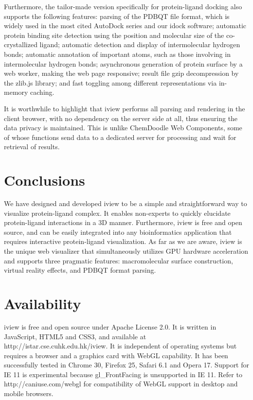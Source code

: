 Furthermore, the tailor-made version specifically for protein-ligand docking also supports the following features: parsing of the PDBQT file format, which is widely used in the most cited AutoDock series and our idock software; automatic protein binding site detection using the position and molecular size of the co-crystallized ligand; automatic detection and display of intermolecular hydrogen bonds; automatic annotation of important atoms, such as those involving in intermolecular hydrogen bonds; asynchronous generation of protein surface by a web worker, making the web page responsive; result file gzip decompression by the zlib.js library; and fast toggling among different representations via in-memory caching.

It is worthwhile to highlight that iview performs all parsing and rendering in the client browser, with no dependency on the server side at all, thus ensuring the data privacy is maintained. This is unlike ChemDoodle Web Components, some of whose functions send data to a dedicated server for processing and wait for retrieval of results.

\section{Conclusions}

We have designed and developed iview to be a simple and straightforward way to visualize protein-ligand complex. It enables non-experts to quickly elucidate protein-ligand interactions in a 3D manner. Furthermore, iview is free and open source, and can be easily integrated into any bioinformatics application that requires interactive protein-ligand visualization. As far as we are aware, iview is the unique web visualizer that simultaneously utilizes GPU hardware acceleration and supports three pragmatic features: macromolecular surface construction, virtual reality effects, and PDBQT format parsing.

\section{Availability}

iview is free and open source under Apache License 2.0. It is written in JavaScript, HTML5 and CSS3, and available at http://istar.cse.cuhk.edu.hk/iview. It is independent of operating systems but requires a browser and a graphics card with WebGL capability. It has been successfully tested in Chrome 30, Firefox 25, Safari 6.1 and Opera 17. Support for IE 11 is experimental because gl\_FrontFacing is unsupported in IE 11. Refer to http://caniuse.com/webgl for compatibility of WebGL support in desktop and mobile browsers.

